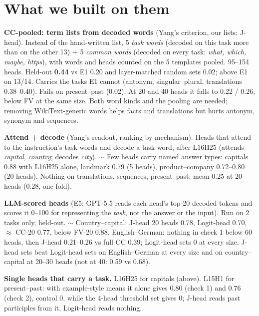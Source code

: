 \documentclass[10pt,a4paper]{article}
\newcommand{\yes}{\textcolor{green!45!black}{\ding{51}}}
\newcommand{\mixed}{\textcolor{orange!80!black}{$\sim$}}
\begin{document}
\section{What we built on them}

\textbf{CC-pooled: term lists from decoded words} (Yang's criterion, our lists; J-head). Instead of the hand-written list, 5 \emph{task words} (decoded on this task more than on the other 13) + 5 \emph{common words} (decoded on every task: \emph{what, which, maybe, https}), with words and heads counted on the 5 templates pooled. 95--154 heads.
\yes{} Held-out \textbf{0.44} vs E1 0.20 and layer-matched random sets 0.02; above E1 on 13/14. Carries the tasks E1 cannot (antonym, singular--plural, translations 0.38--0.40). Fails on present--past (0.02). At 20 and 40 heads it falls to 0.22 / 0.26, below FV at the same size. Both word kinds and the pooling are needed; removing WikiText-generic words helps facts and translations but hurts antonym, synonym and sequences.

\textbf{Attend + decode} (Yang's readout, ranking by mechanism). Heads that attend to the instruction's task words and decode a task word, after L16H25 (attends \emph{capital}, \emph{country}; decodes \emph{city}).
\mixed{} Few heads carry named answer types: capitals 0.88 with L16H25 alone, landmark 0.79 (5 heads), product--company 0.72--0.80 (20 heads). Nothing on translations, sequences, present--past; mean 0.25 at 20 heads (0.28, one fold).

\textbf{LLM-scored heads} (E5; GPT-5.5 reads each head's top-20 decoded tokens and scores it 0--100 for representing the \emph{task}, not the answer or the input). Run on 2 tasks only, held-out.
\mixed{} Country--capital: J-head 20 heads 0.78, Logit-head 0.70, $\approx$ CC-20 0.77, below FV-20 0.88. English--German: nothing in check 1 below 60 heads, then J-head 0.21--0.26 vs full CC 0.39; Logit-head sets 0 at every size. J-head sets beat Logit-head sets on English--German at every size and on country--capital at 20--30 heads (not at 40: 0.59 vs 0.68).

\textbf{Single heads that carry a task.} L16H25 for capitals (above). L15H1 for present--past: with example-style means it alone gives 0.80 (check 1) and 0.76 (check 2), control 0, while the 4-head threshold set gives 0; J-head reads past participles from it, Logit-head reads nothing.

\end{document}
